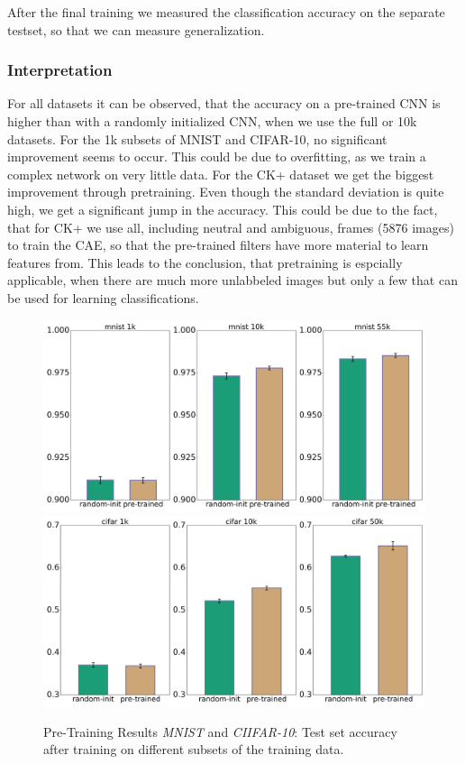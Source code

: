 \documentclass{article}
\begin{document}
    After the final training we measured the classification accuracy on the separate testset, so that we can measure generalization.
    \subsubsection{Interpretation}
      For all datasets it can be observed, that the accuracy on a pre-trained CNN is higher than with a randomly initialized CNN, when we use the full or 10k datasets.
      For the 1k subsets of MNIST and CIFAR-10, no significant improvement seems to occur. This could
      be due to overfitting, as we train a complex network on very little data.
      For the CK+ dataset we get the biggest improvement through pretraining.
      Even though the standard deviation is quite high, we get a significant jump in the accuracy.
      This could be due to the fact, that for CK+ we use all, including neutral and ambiguous, frames (5876 images) to train the CAE, so that the pre-trained filters have more material to learn features from.
      This leads to the conclusion, that pretraining is espcially applicable, when there are much more unlabbeled images but only a few that can be used for learning classifications.

    \begin{figure}
      \includegraphics[width=.4\linewidth]{../box_plots/boxplots_mnist.png}
      \includegraphics[width=.4\linewidth]{../box_plots/boxplots_cifar.png}

      \caption{Pre-Training Results \emph{MNIST} and \emph{CIIFAR-10}: Test set accuracy after training on different subsets of the training data.}
      \label{fig:mnist_cifar_plot}
    \end{figure}
\end{document}
